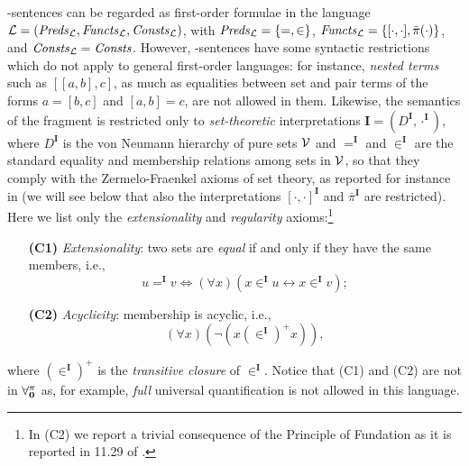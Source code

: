 \documentclass[a4paper]{llncs}
\newcommand{\Lang}{\ensuremath{\mathcal{L}\xspace}} %
\newcommand{\LangPreds}{\Preds_{\Lang}}
\newcommand{\LangFuncts}{\Functs_{\Lang}}
\newcommand{\LangConsts}{\Consts_{\Lang}}
\newcommand{\nonpairssym}{\bar{\pi}}
\newcommand{\nonpairs}[1]{\nonpairssym(#1)}
\newcommand{\inter}{\ensuremath{\mathbf{I}}\xspace}
\begin{document}
\Forallpizero-sentences can be regarded as first-order
formulae in the language $\Lang=(\LangPreds, \LangFuncts, \LangConsts)$, with
$\LangPreds=\{ = ,\in \}$, $\LangFuncts=\{ [\cdot, \cdot], 
\nonpairs{\cdot} \}$,
and $\LangConsts=\Consts$. However, \Forallpizero-sentences have some
syntactic restrictions which do not apply to general first-order
languages: for instance, \emph{nested terms} such as $[[a,b],c]$,
as much as equalities between set and pair terms of the forms $a=[b,c]$
and $[a,b]=c$, 
are not allowed in them. Likewise, the semantics of the fragment 
\Forallpizero is restricted only to \emph{set-theoretic} 
interpretations $\inter=(D^{\inter}, \cdot^\inter)$, where 
$D^{\inter}$ is the von Neumann hierarchy of pure sets $\mathcal{V}$ and 
$=^{\inter}$ and $\in^{\inter}$ are the standard equality and 
membership relations among sets in $\mathcal{V}$, so that they comply with 
the Zermelo-Fraenkel axioms of set theory, as reported for instance 
in \cite{Mos2005} (we will see below  that  also the interpretations 
$[\cdot,\cdot]^\inter$ and $\nonpairssym^{\inter}$ are restricted).
Here we list only the \emph{extensionality} and
\emph{regularity} axioms:\footnote{In 
(C2) we report a trivial consequence of the Principle of Fundation 
as it is reported in 11.29 of \cite{Mos2005}.}
\begin{enumerate}[leftmargin=.9cm]
  \item[\textbf{(C1)}]\label{EXT} \emph{Extensionality}: two sets are 
\emph{equal} if and only if they have the same members, i.e.,
\[
  u =^{\inter} v \iff (\forall x)(x \in^{\inter} u \leftrightarrow x 
\in^{\inter} v) ;
\]
  \item[\textbf{(C2)}]\label{REG} \emph{Acyclicity}: membership is 
acyclic, i.e.,
\[
  (\forall x)(\neg (x \mathrel{(\in^{\inter})^{+}} x)) ,
\]
\end{enumerate}
where $(\in^{\inter})^{+}$ is the \emph{transitive closure} of $\in^{\inter}$.
Notice that (C1) and (C2) are not in $\mathbf{\forall_{0}^{\pi}}$
as, for example, \emph{full} universal quantification is not allowed in
this language.
%
\end{document}
